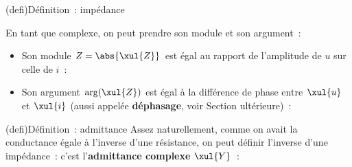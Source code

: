 \documentclass[../../main/main.tex]{subfiles}
\begin{document}
\begin{tcb}[sidebyside](defi){Définition~: impédance}
	\tcblower
	\begin{center}
	\end{center}
\end{tcb}

En tant que complexe, on peut prendre son module et son argument~:
\begin{itemize}
	\item Son module $Z = \abs{\xul{Z}}$ est égal au rapport de
	      l'amplitude de $u$ sur celle de $i$~:
	      \psw{
		      \[
			      \boxed{ \abs{\xul{Z}}
				      = \frac{|\xul{u}|}{|\xul{i}|}
				      = \frac{U}{I}
			      }
		      \]
	      }
	\item Son argument $\arg(\xul{Z})$ est égal à la différence de phase entre
	      $\xul{u}$ et $\xul{i}$ (aussi appelée \textbf{déphasage}, voir Section
	      ultérieure)~:
	      \psw{
		      \[
			      \boxed{\arg(\xul{Z})
				      = \arg \left( \frac{\xul{u}}{\xul{i}} \right)
				      = \f_u - \f_i}
		      \]
	      }
\end{itemize}

\begin{tcb}(defi){Définition~: admittance}
	Assez naturellement, comme on avait la conductance égale à l'inverse d'une
	résistance, on peut définir l'inverse d'une impédance~: c'est
	l'\textbf{admittance complexe} $\xul{Y}$~:
	\psw{
		\[
			\boxed{\xul{Y}
				= \frac{1}{\xul{Z}} \Rightarrow \xul{I}
				= \xul{Y}\times\xul{U}}
		\]
	}
\end{tcb}
\end{document}
